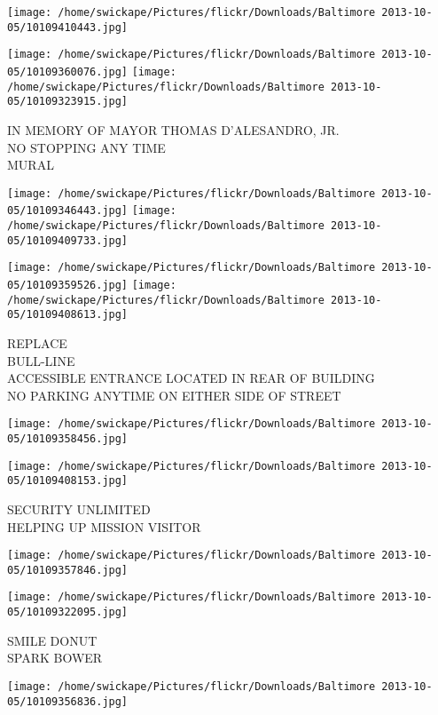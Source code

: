 \documentclass[10pt,letterpaper]{article}
\begin{document}
\texttt{[image: /home/swickape/Pictures/flickr/Downloads/Baltimore 2013-10-05/10109410443.jpg]}

\vspace{0.25in}
\texttt{[image: /home/swickape/Pictures/flickr/Downloads/Baltimore 2013-10-05/10109360076.jpg]}
\texttt{[image: /home/swickape/Pictures/flickr/Downloads/Baltimore 2013-10-05/10109323915.jpg]}

IN MEMORY OF MAYOR THOMAS D'ALESANDRO, JR.\\
NO STOPPING ANY TIME\\
MURAL
\pagebreak

\texttt{[image: /home/swickape/Pictures/flickr/Downloads/Baltimore 2013-10-05/10109346443.jpg]}
\texttt{[image: /home/swickape/Pictures/flickr/Downloads/Baltimore 2013-10-05/10109409733.jpg]}

\texttt{[image: /home/swickape/Pictures/flickr/Downloads/Baltimore 2013-10-05/10109359526.jpg]}
\texttt{[image: /home/swickape/Pictures/flickr/Downloads/Baltimore 2013-10-05/10109408613.jpg]}

REPLACE\\
BULL{-}LINE\\
ACCESSIBLE ENTRANCE LOCATED IN REAR OF BUILDING\\
NO PARKING ANYTIME ON EITHER SIDE OF STREET
\pagebreak

\texttt{[image: /home/swickape/Pictures/flickr/Downloads/Baltimore 2013-10-05/10109358456.jpg]}

\vspace{0.25in}
\texttt{[image: /home/swickape/Pictures/flickr/Downloads/Baltimore 2013-10-05/10109408153.jpg]}

SECURITY UNLIMITED\\
HELPING UP MISSION VISITOR
\pagebreak

\texttt{[image: /home/swickape/Pictures/flickr/Downloads/Baltimore 2013-10-05/10109357846.jpg]}

\vspace{0.25in}
\texttt{[image: /home/swickape/Pictures/flickr/Downloads/Baltimore 2013-10-05/10109322095.jpg]}

SMILE DONUT\\
SPARK BOWER
\pagebreak

\texttt{[image: /home/swickape/Pictures/flickr/Downloads/Baltimore 2013-10-05/10109356836.jpg]}
\end{document}
